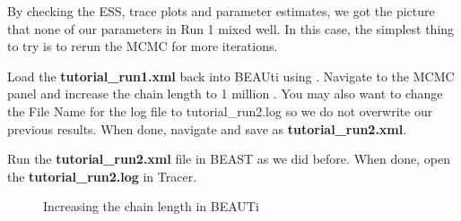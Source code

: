 \documentclass[11pt]{article}
\begin{document}
By checking the ESS, trace plots and parameter estimates, we got the picture that none of our parameters in Run 1 mixed well. In this case, the simplest thing to try is to rerun the MCMC for more iterations.

\begin{framed}
Load the \textbf{tutorial\_run1.xml} back into BEAUti using . Navigate to the MCMC panel and increase the chain length to 1 million \label{fig:beauti_run2}. You may also want to change the File Name for the log file to tutorial\_run2.log so we do not overwrite our previous results. When done, navigate  and save as \textbf{tutorial\_run2.xml}.
\end{framed}

\begin{framed}
Run the \textbf{tutorial\_run2.xml} file in BEAST as we did before. When done, open the \textbf{tutorial\_run2.log} in Tracer.
\end{framed}

\begin{figure}[!h]
\centering
{}
\caption{\small Increasing the chain length in BEAUTi}
\label{fig:beauti_run2}
\end{figure}
\end{document}
